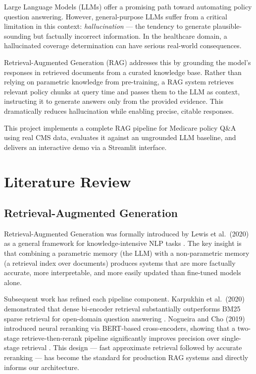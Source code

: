 \documentclass[12pt, letterpaper]{article}
\begin{document}
Large Language Models (LLMs) offer a promising path toward automating policy question
answering. However, general-purpose LLMs suffer from a critical limitation in this
context: \textit{hallucination} --- the tendency to generate plausible-sounding but
factually incorrect information. In the healthcare domain, a hallucinated coverage
determination can have serious real-world consequences.

Retrieval-Augmented Generation (RAG) addresses this by grounding the model's responses
in retrieved documents from a curated knowledge base. Rather than relying on parametric
knowledge from pre-training, a RAG system retrieves relevant policy chunks at query time
and passes them to the LLM as context, instructing it to generate answers only from
the provided evidence. This dramatically reduces hallucination while enabling precise,
citable responses.

This project implements a complete RAG pipeline for Medicare policy Q\&A using real CMS
data, evaluates it against an ungrounded LLM baseline, and delivers an interactive demo
via a Streamlit interface.

\section{Literature Review}

\subsection{Retrieval-Augmented Generation}

Retrieval-Augmented Generation was formally introduced by Lewis et al.\ (2020) as a
general framework for knowledge-intensive NLP tasks \cite{lewis2020rag}. The key insight
is that combining a parametric memory (the LLM) with a non-parametric memory (a retrieval
index over documents) produces systems that are more factually accurate, more interpretable,
and more easily updated than fine-tuned models alone.

Subsequent work has refined each pipeline component. Karpukhin et al.\ (2020) demonstrated
that dense bi-encoder retrieval substantially outperforms BM25 sparse retrieval for
open-domain question answering \cite{karpukhin2020dpr}. Nogueira and Cho (2019) introduced
neural reranking via BERT-based cross-encoders, showing that a two-stage retrieve-then-rerank
pipeline significantly improves precision over single-stage retrieval \cite{nogueira2019reranker}.
This design --- fast approximate retrieval followed by accurate reranking --- has become the
standard for production RAG systems and directly informs our architecture.
\end{document}
